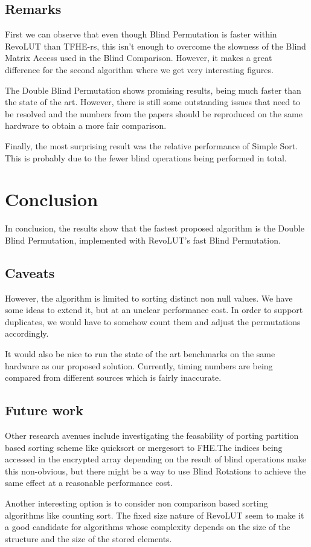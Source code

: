 \documentclass{article}
\begin{document}
\subsection{Remarks}

First we can observe that even though Blind Permutation is faster within RevoLUT than TFHE-rs, this isn't enough to overcome the slowness of the Blind Matrix Access used in the Blind Comparison. However, it makes a great difference for the second algorithm where we get very interesting figures.

The Double Blind Permutation shows promising results, being much faster than the state of the art. However, there is still some outstanding issues that need to be resolved and the numbers from the papers should be reproduced on the same hardware to obtain a more fair comparison.

Finally, the most surprising result was the relative performance of Simple Sort. This is probably due to the fewer blind operations being performed in total.

\newpage

\section{Conclusion}

In conclusion, the results show that the fastest proposed algorithm is the Double Blind Permutation, implemented with RevoLUT's fast Blind Permutation.

\subsection{Caveats}

However, the algorithm is limited to sorting distinct non null values. We have some ideas to extend it, but at an unclear performance cost. In order to support duplicates, we would have to somehow count them and adjust the permutations accordingly.

It would also be nice to run the state of the art benchmarks on the same hardware as our proposed solution. Currently, timing numbers are being compared from different sources which is fairly inaccurate.

\subsection{Future work}

Other research avenues include investigating the feasability of porting partition based sorting scheme like quicksort or mergesort to FHE.\@ The indices being accessed in the encrypted array depending on the result of blind operations make this non-obvious, but there might be a way to use Blind Rotations to achieve the same effect at a reasonable performance cost.

Another interesting option is to consider non comparison based sorting algorithms like counting sort. The fixed size nature of RevoLUT seem to make it a good candidate for algorithms whose complexity depends on the size of the structure and the size of the stored elements.



\end{document}
